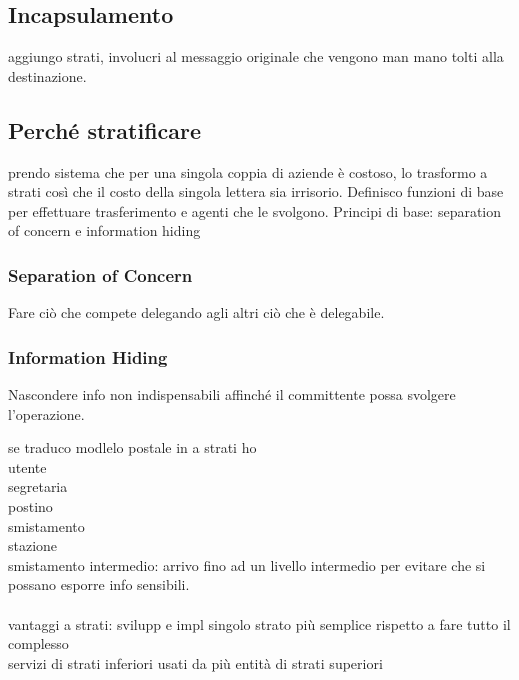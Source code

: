 \documentclass[10pt]{article}
\begin{document}
\subsection{Incapsulamento} aggiungo strati, involucri al messaggio originale che vengono man mano tolti alla destinazione.
\subsection{Perché stratificare} prendo sistema che per una singola coppia di aziende è costoso, lo trasformo a strati così che il costo della singola lettera sia irrisorio.
Definisco funzioni di base per effettuare trasferimento e agenti che le svolgono.
Principi di base: separation of concern e information hiding
\subsubsection{Separation of Concern}
Fare ciò che compete delegando agli altri ciò che è delegabile.
\subsubsection{Information Hiding}
Nascondere info non indispensabili affinché il committente possa svolgere l'operazione.

se traduco modlelo postale in a strati ho\\
utente\\segretaria\\postino\\smistamento\\stazione\\
smistamento intermedio: arrivo fino ad un livello intermedio per evitare che si possano esporre info sensibili.\\\\
vantaggi a strati: svilupp e impl singolo strato più semplice rispetto a fare tutto il complesso\\
servizi di strati inferiori usati da più entità di strati superiori\\\\
\end{document}
